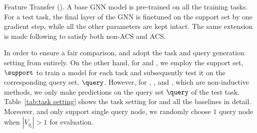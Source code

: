 {\begin{itemize}
 Feature Transfer (\Featrans). A base GNN model is
pre-trained on all the training tasks. For a test task, the final layer of the GNN is finetuned on the support set by one gradient step, while all the other parameters are kept intact. The same extension is made following \Supervise to satisfy both non-ACS and ACS.
\end{itemize}
In order to ensure a fair comparison, \MAML and \Featrans adopt the task and query generation setting from \IACS entirely. On the other hand, for \Supervise and \AQDGNN, %
we employ the support set, $\support$ to train a model for each task and subsequently test it on the corresponding query set, $\query$. However, for \CTC, \ATC, \ACQ and \ICSGNN, which are non-inductive methods, we only make predictions on the query set $\query$ of the test task. Table~\ref{tab:task setting} shows the task setting for \IACS and all the baselines in detail. Moreover, \ACQ %
and \ICSGNN only support single query node, we randomly choose $1$ query node when $|V_{q_i}|>1$ for evaluation. 
}



